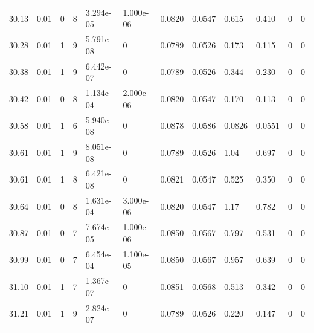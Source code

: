 \documentclass[preview]{standalone}
\begin{document}
{{{{{{{{\begin{tabular}{L{1.2cm}C{1.2cm} C{0.3cm}C{0.5cm} C{1.4cm}C{1.4cm} C{1.4cm}C{1.4cm} C{1.6cm}C{1.6cm} C{1.6cm}C{1.6cm}}
  30.13  &  0.01  & 0     &  8 &  3.294e-05  & 1.000e-06  &  0.0820&   0.0547& 0.615 & 0.410   &  0 & 0  \\ 
  30.28  &  0.01  & 1     &  9 &  5.791e-08  & 0  &  0.0789&   0.0526& 0.173 & 0.115   &  0 & 0  \\ 
  30.38  &  0.01  & 1     &  9 &  6.442e-07  & 0  &  0.0789&   0.0526& 0.344 & 0.230   &  0 & 0  \\ 
  30.42  &  0.01  & 0     &  8 &  1.134e-04  & 2.000e-06  &  0.0820&   0.0547& 0.170 & 0.113   &  0 & 0  \\ 
  30.58  &  0.01  & 1     &  6 &  5.940e-08  & 0  &  0.0878&   0.0586& 0.0826 & 0.0551   &  0 & 0  \\ 
  30.61  &  0.01  & 1     &  9 &  8.051e-08  & 0  &  0.0789&   0.0526& 1.04 & 0.697   &  0 & 0  \\ 
  30.61  &  0.01  & 1     &  8 &  6.421e-08  & 0  &  0.0821&   0.0547& 0.525 & 0.350   &  0 & 0  \\ 
  30.64  &  0.01  & 0     &  8 &  1.631e-04  & 3.000e-06  &  0.0820&   0.0547& 1.17 & 0.782   &  0 & 0  \\ 
  30.87  &  0.01  & 0     &  7 &  7.674e-05  & 1.000e-06  &  0.0850&   0.0567& 0.797 & 0.531   &  0 & 0  \\ 
  30.99  &  0.01  & 0     &  7 &  6.454e-04  & 1.100e-05  &  0.0850&   0.0567& 0.957 & 0.639   &  0 & 0  \\ 
  31.10  &  0.01  & 1     &  7 &  1.367e-07  & 0  &  0.0851&   0.0568& 0.513 & 0.342   &  0 & 0  \\ 
  31.21  &  0.01  & 1     &  9 &  2.824e-07  & 0  &  0.0789&   0.0526& 0.220 & 0.147   &  0 & 0  \\ 
\hline 
\end{tabular} 

}}}}}}}}
\end{document}
